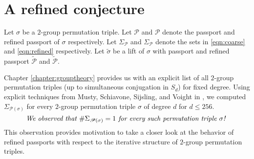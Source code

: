 \documentclass{dcthesis}
\newcommand{\ZZ}{\mathbb Z}
\newcommand{\wt}[1]{\widetilde{#1}}
\numberwithin{equation}{section}
\newtheorem{lemma}[equation]{Lemma}
\theoremstyle{definition}
\theoremstyle{remark}
\begin{document}
{{  \section{A refined conjecture}{
    \label{sec:conjecture}
    Let $\sigma$ be a $2$-group permutation triple.
    Let $\mathcal{P}$ and $\mathscr{P}$ denote the
    passport and refined passport of $\sigma$
    respectively.
    Let
    $\Sigma_\mathcal{P}$ and $\Sigma_\mathscr{P}$
    denote the sets in
    \eqref{eqn:coarse}
    and
    \eqref{eqn:refined}
    respectively.
    Let $\wt{\sigma}$ be a lift of $\sigma$
    with passport and refined passport
    $\wt{\mathcal{P}}$ and $\wt{\mathscr{P}}$.
    \par
    Chapter \ref{chapter:grouptheory}
    provides us with an explicit list
    of all $2$-group permutation triples
    (up to simultaneous conjugation in $S_d$)
    for fixed degree.
    Using explicit techniques from
    Musty, Schiavone, Sijsling, and Voight
    in \cite{belyidb},
    we computed $\Sigma_{\mathscr{P}(\sigma)}$ for
    every $2$-group permutation triple
    $\sigma$
    of degree $d$
    for $d\leq 256$.
    \begin{equation}
      \label{eqn:theobservation}
      \text{
        \emph{
          We observed that
          $\#\Sigma_{\mathscr{P}(\sigma)}=1$
          for every such permutation
          triple $\sigma$!
        }
      }
    \end{equation}
    This observation
    provides motivation to
    take a closer look at
    the behavior
    of refined passports with respect
    to the iterative structure of
    $2$-group permutation triples.
}}}
\end{document}

